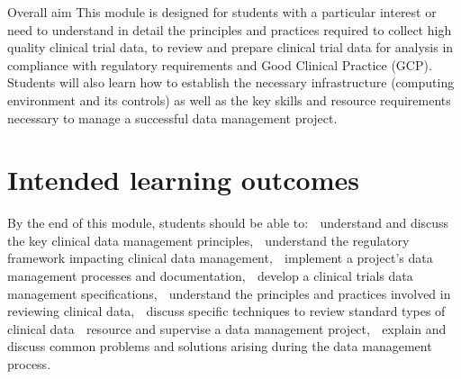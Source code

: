 
Overall aim This module is designed for students with a particular interest or need to
understand in detail the principles and practices required to collect high
quality clinical trial data, to review and prepare clinical trial data for analysis in
compliance with regulatory requirements and Good Clinical Practice (GCP).
Students will also learn how to establish the necessary infrastructure
(computing environment and its controls) as well as the key skills and resource
requirements necessary to manage a successful data management project.

\section*{Intended learning outcomes}
By the end of this module, students should be able to:
 understand and discuss the key clinical data management principles,
 understand the regulatory framework impacting clinical data management,
 implement a project’s data management processes and documentation,
 develop a clinical trials data management specifications,
 understand the principles and practices involved in reviewing clinical data,
 discuss specific techniques to review standard types of clinical data
 resource and supervise a data management project,
 explain and discuss common problems and solutions arising during the
data management process.


